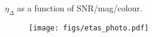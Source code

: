 $\eta_\Delta$ as a function of SNR/mag/colour. 

\begin{figure}
\begin{center}
    \texttt{[image: figs/etas\_photo.pdf]}
    \caption{} 
    \label{fig:systematics}
\end{center}
\end{figure}




